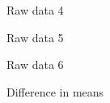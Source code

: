 \documentclass[aspectratio=169]{beamer}
\begin{document}
\begin{frame}{Raw data 4}
    \center
\end{frame}

\begin{frame}{Raw data 5}
    \center
\end{frame}

\begin{frame}{Raw data 6}
    \center
\end{frame}

\begin{frame}{Difference in means}
    \center
\end{frame}
\end{document}
